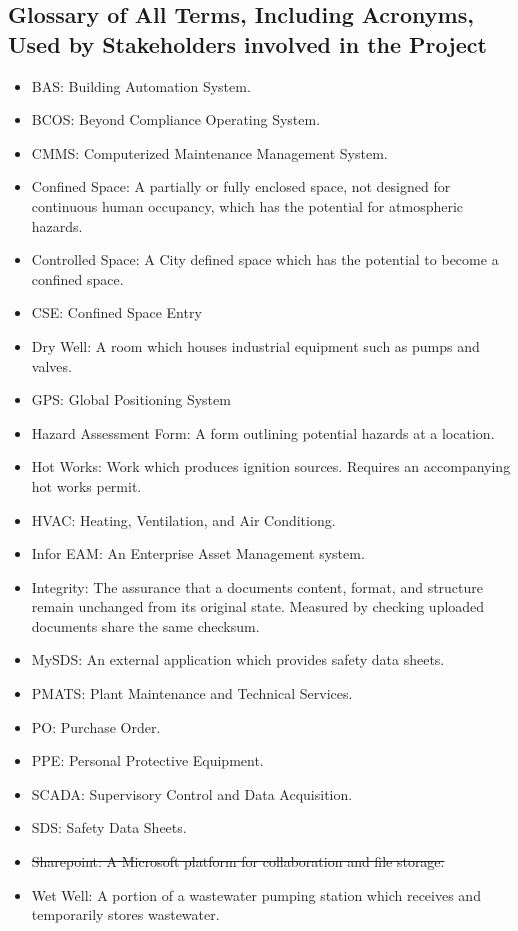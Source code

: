 \documentclass[12pt]{article}
\begin{document}
\subsection{Glossary of All Terms, Including Acronyms, Used by Stakeholders
involved in the Project}
\begin{itemize}
  \item BAS: Building Automation System.
  \item BCOS: Beyond Compliance Operating System.
  \item CMMS: Computerized Maintenance Management System.
  \item Confined Space: A partially or fully enclosed space, not designed for
    continuous human occupancy, which has the potential for atmospheric hazards.
  \item Controlled Space: A City defined space which has the potential to
    become a confined space.
  \item CSE: Confined Space Entry
  \item Dry Well: A room which houses industrial equipment such as pumps
    and valves.
  \item GPS: Global Positioning System
  \item Hazard Assessment Form: A form outlining potential
    hazards at a location.
  \item Hot Works: Work which produces ignition sources.
    Requires an accompanying hot works permit.
  \item HVAC: Heating, Ventilation, and Air Conditiong.
  \item Infor EAM: An Enterprise Asset Management system.
  \item Integrity: The assurance that a documents content, format,
    and structure remain unchanged from its original state.
    Measured by checking uploaded documents share the same checksum.
  \item MySDS: An external application which provides safety data sheets.
  \item PMATS: Plant Maintenance and Technical Services.
  \item PO: Purchase Order.
  \item PPE: Personal Protective Equipment.
  \item SCADA: Supervisory Control and Data Acquisition.
  \item SDS: Safety Data Sheets.
  \item \sout{Sharepoint: A Microsoft platform for collaboration and
    file storage.}
  \item Wet Well: A portion of a wastewater pumping station which receives
    and temporarily stores wastewater.
\end{itemize}
\end{document}
